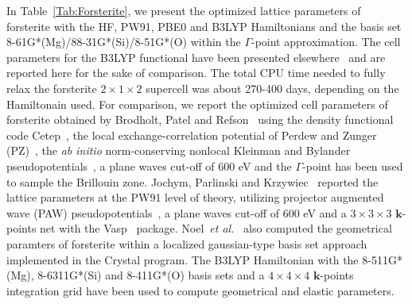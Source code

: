 \documentclass[pra,twocolumn,twocolumngrid,superbib]{revtex4} %
\begin{document}
In Table~\ref{Tab:Forsterite}, we present the optimized lattice parameters of forsterite 
with the HF, PW91, PBE0 and B3LYP Hamiltonians and the basis set 
8-61G*(Mg)/88-31G*(Si)/8-51G*(O) within the $\Gamma$-point approximation.
The cell parameters for the B3LYP functional have been presented 
elsewhere~\cite{VWeber06b} and are reported here for the sake of comparison.
The total CPU time needed to fully relax the forsterite $2\times 1\times 2$ supercell 
was about 270-400 days, depending on the Hamiltonain used.
For comparison, we report the optimized cell parameters of forsterite
obtained by Brodholt, Patel and Refson~\cite{JBrodholt96} using the density functional code 
{\sc Cetep}~\cite{MPayne92}, the local exchange-correlation potential of 
Perdew and Zunger (PZ)~\cite{JPerdew81}, the \emph{ab initio} norm-conserving nonlocal 
Kleinman and Bylander pseudopotentials~\cite{LKleinman82}, a plane waves cut-off of 600 eV
and the $\Gamma$-point has been used to sample the Brillouin zone.
Jochym, Parlinski and Krzywiec~\cite{PJochym04} reported the lattice parameters
at the PW91 level of theory, utilizing projector augmented wave (PAW) 
pseudopotentials~\cite{PBlochl94,GKresse99}, a plane waves cut-off of 600 eV and 
a $3\times 3\times 3$ $\mathbf{k}$-points net
with the {\sc Vasp}~\cite{Kresse96a,Kresse96b} package.
Noel~\emph{et al.}~\cite{YNoel06} also computed the geometrical paramters of forsterite within 
a localized gaussian-type basis set approach implemented in the {\sc Crystal} program.
The B3LYP Hamiltonian with the 8-511G*(Mg), 8-6311G*(Si) and 8-411G*(O) basis sets and
a $4\times 4\times 4$ $\mathbf{k}$-points integration grid have been used to compute
geometrical and elastic parameters.
\end{document}
